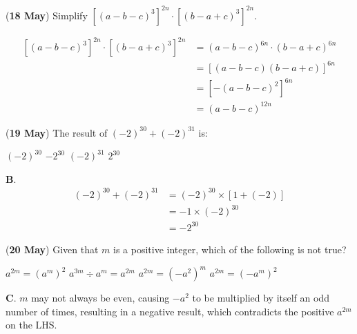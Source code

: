 \documentclass[12pt, answers]{exam} %
\begin{document}
\begin{questions}
	\question (\textbf{18 May}) Simplify \(\left[\left(a - b - c\right)^{3}\right]^{2n} \cdot \left[\left(b - a + c\right)^{3}\right]^{2n}\).
	\begin{solution}
		\begin{align*}
			{\left[{\left(a - b - c\right)}^{3}\right]}^{2n} \cdot {\left[{\left(b - a + c\right)}^{3}\right]}^{2n} & = {\left(a - b - c\right)}^{6n} \cdot {\left(b - a + c\right)}^{6n} \\
			                                                                                                        & = {\left[\left(a - b - c\right)\left(b - a + c\right)\right]}^{6n}  \\
			                                                                                                        & = {\left[-{\left(a - b - c\right)}^{2}\right]}^{6n}                 \\
			                                                                                                        & = {\left(a - b - c\right)}^{12n}
		\end{align*}
	\end{solution}
	
	\question (\textbf{19 May}) The result of \((-2)^{30} + (-2)^{31}\) is:
	
	\begin{oneparchoices}
	\choice \((-2)^{30}\)
	\choice \(-2^{30}\)
	\choice \((-2)^{31}\)
	\choice \(2^{30}\)
	\end{oneparchoices}
	\begin{solution}
	\textbf{B}.
	    \begin{align*}
	        (-2)^{30} + (-2)^{31} &= (-2)^{30} \times \left[1 + (-2)\right] \\
	        &= -1 \times (-2)^{30} \\
	        &= -2^{30}
	    \end{align*}
	\end{solution}
	
	\question (\textbf{20 May}) Given that \(m\) is a positive integer, which of the following is not true?
	
	\begin{oneparchoices}
	\choice \(a^{2m} = \left(a^m\right)^2\)
	\choice \(a^{3m} \div a^m = a^{2m}\)
	\choice \(a^{2m} = \left(-a^2\right)^m\)
	\choice \(a^{2m} = \left(-a^m\right)^2\)
	\end{oneparchoices}
	\begin{solution}
	\textbf{C}. \(m\) may not always be even, causing \(-a^2\) to be multiplied by itself an odd number of times, resulting in a negative result, which contradicts the positive \(a^{2m}\) on the LHS. 
	\end{solution}
	

\end{questions}
\end{document}
